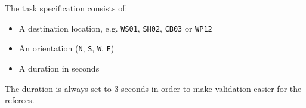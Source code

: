 The task specification consists of:

\begin{itemize}
	\item A destination location, e.g. \texttt{WS01}, \texttt{SH02}, \texttt{CB03} or \texttt{WP12}
	\item An orientation (\texttt{N}, \texttt{S}, \texttt{W}, \texttt{E})
	\item A duration in seconds
\end{itemize}

The duration is always set to 3 seconds in order to make validation easier for the referees.
%
%
%
%
%
%
%
%
%
